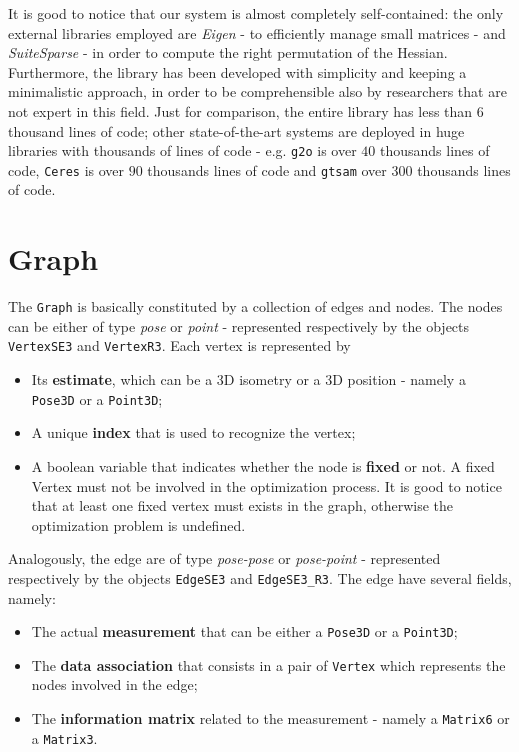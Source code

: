 It is good to notice that our system is almost completely self-contained: the only external libraries employed are \textit{Eigen} \cite{eigen} - to efficiently manage small matrices  - and \textit{SuiteSparse} \cite{suitesparse} - in order to compute the right permutation of the Hessian. Furthermore, the library has been developed with simplicity and keeping a minimalistic approach, in order to be comprehensible also by researchers that are not expert in this field. Just for comparison, the entire library has less than $6$ thousand lines of code; other state-of-the-art systems are deployed in huge libraries with thousands of lines of code - e.g. \texttt{g2o} \cite{kummerle2011g} is over $40$ thousands lines of code, \texttt{Ceres} \cite{ceres-solver} is over $90$ thousands lines of code and \texttt{gtsam} \cite{dellaert2012gtsam} over $300$ thousands lines of code.

\section{Graph}\label{sec:graph_implementation}
The \texttt{Graph} is basically constituted by a collection of edges and nodes. The nodes can be either of type \textit{pose} or \textit{point} - represented respectively by the objects \texttt{VertexSE3} and \texttt{VertexR3}. Each vertex is represented by

\begin{itemize}
    \item Its \textbf{estimate}, which can be a 3D isometry or a 3D position - namely a \texttt{Pose3D} or a \texttt{Point3D};
    \item A unique \textbf{index} that is used to recognize the vertex;
    \item A boolean variable that indicates whether the node is \textbf{fixed} or not. A fixed Vertex must not be involved in the optimization process. It is good to notice that at least one fixed vertex must exists in the graph, otherwise the optimization problem is undefined.
\end{itemize}

Analogously, the edge are of type \textit{pose-pose} or \textit{pose-point} - represented respectively by the objects \texttt{EdgeSE3} and \texttt{EdgeSE3\_R3}. The edge have several fields, namely:

\begin{itemize}
    \item The actual \textbf{measurement} that can be either a \texttt{Pose3D} or a \texttt{Point3D};
    \item The \textbf{data association} that consists in a pair of \texttt{Vertex} which represents the nodes involved in the edge;
    \item The \textbf{information matrix} related to the measurement - namely a \texttt{Matrix6} or a \texttt{Matrix3}.
\end{itemize}

